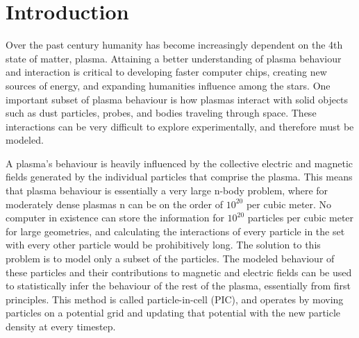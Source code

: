 
\chapter{Introduction}
\label{ch:introduction}
	Over the past century humanity has become increasingly dependent on the 4th state of matter, plasma. Attaining a better understanding of plasma behaviour and interaction is critical to developing faster computer chips, creating new sources of energy, and expanding humanities influence among the stars. One important subset of plasma behaviour is how plasmas interact with solid objects such as dust particles, probes, and bodies traveling through space. These interactions can be very difficult to explore experimentally, and therefore must be modeled. 
	
A plasma's behaviour is heavily influenced by the collective electric and magnetic fields generated by the individual particles that comprise the plasma. This means that plasma behaviour is essentially a very large n-body problem, where for moderately dense plasmas n can be on the order of $10^{20}$ per cubic meter. No computer in existence can store the information for $10^{20}$ particles per cubic meter for large geometries, and calculating the interactions of every particle in the set with every other particle would be prohibitively long. The solution to this problem is to model only a subset of the particles. The modeled behaviour of these particles and their contributions to magnetic and electric fields can be used to statistically infer the behaviour of the rest of the plasma, essentially from first principles. This method is called particle-in-cell (PIC), and operates by moving particles on a potential grid and updating that potential with the new particle density at every timestep. 

